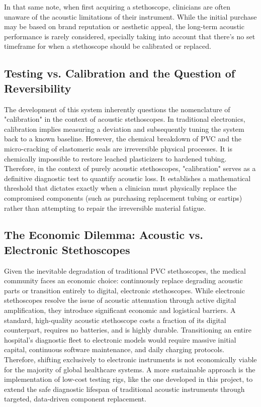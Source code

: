 In that same note, when first acquiring a stethoscope, clinicians are often unaware of the acoustic limitations of their instrument. While the initial purchase may be based on brand reputation or aesthetic appeal, the long-term acoustic performance is rarely considered, specially taking into account that there's no set timeframe for when a stethoscope should be calibrated or replaced.

\subsection{Testing vs. Calibration and the Question of Reversibility}
The development of this system inherently questions the nomenclature of "calibration" in the context of acoustic stethoscopes. In traditional electronics, calibration implies measuring a deviation and subsequently tuning the system back to a known baseline. However, the chemical breakdown of PVC and the micro-cracking of elastomeric seals are irreversible physical processes. It is chemically impossible to restore leached plasticizers to hardened tubing. Therefore, in the context of purely acoustic stethoscopes, "calibration" serves as a definitive diagnostic test to quantify acoustic loss. It establishes a mathematical threshold that dictates exactly when a clinician must physically replace the compromised components (such as purchasing replacement tubing or eartips) rather than attempting to repair the irreversible material fatigue.

\subsection{The Economic Dilemma: Acoustic vs. Electronic Stethoscopes}
Given the inevitable degradation of traditional PVC stethoscopes, the medical community faces an economic choice: continuously replace degrading acoustic parts or transition entirely to digital, electronic stethoscopes. While electronic stethoscopes resolve the issue of acoustic attenuation through active digital amplification, they introduce significant economic and logistical barriers. A standard, high-quality acoustic stethoscope costs a fraction of its digital counterpart, requires no batteries, and is highly durable. Transitioning an entire hospital's diagnostic fleet to electronic models would require massive initial capital, continuous software maintenance, and daily charging protocols. Therefore, shifting exclusively to electronic instruments is not economically viable for the majority of global healthcare systems. A more sustainable approach is the implementation of low-cost testing rigs, like the one developed in this project, to extend the safe diagnostic lifespan of traditional acoustic instruments through targeted, data-driven component replacement.